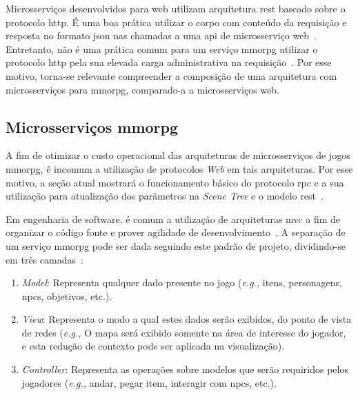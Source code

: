 Microsserviços desenvolvidos para web utilizam arquitetura \ac{rest} baseado sobre o protocolo \ac{http}.
%
É uma boa prática utilizar o corpo com conteúdo da requisição e resposta no formato \ac{json} nas chamadas a uma \ac{api} de microsserviço web~\cite{Nadareishvili2016Aug}.
%
Entretanto, não é uma prática comum para um serviço \ac{mmorpg} utilizar o protocolo \ac{http} pela sua elevada carga administrativa na requisição~\cite{1417630}.
%
Por esse motivo, torna-se relevante compreender a composição de uma arquitetura com microsserviços para \ac{mmorpg}, comparado-a a microsserviços web.



\subsection{Microsserviços \ac{mmorpg}}
\label{sec:arquiteturas}



A fim de otimizar o custo operacional das arquiteturas de microsserviços de jogos \ac{mmorpg}, é incomum a utilização de protocolos \textit{Web} em tais arquiteturas.
%
Por esse motivo, a seção atual mostrará o funcionamento básico do protocolo \ac{rpc} e a sua utilização para atualização dos parâmetros na \textit{Scene Tree} e o modelo \ac{rest}~\cite{albion_online_unite}.



Em engenharia de software, é comum a utilização de arquiteturas \ac{mvc} a fim de organizar o código fonte e prover agilidade de desenvolvimento~\cite{Chadwick2012Oct, LeckyThompson2008Nov}.
%
A separação de um serviço \ac{mmorpg} pode ser dada seguindo este padrão de projeto, dividindo-se em três camadas~\cite{5718337}:


\begin{enumerate}
  \item \textit{Model}: Representa qualquer dado presente no jogo (\textit{e.g.,} itens, personagens, \ac{npcs}, objetivos, etc.).
  \item \textit{View}: Representa o modo a qual estes dados serão exibidos, do ponto de vista de redes (\textit{e.g.,} O mapa será exibido somente na área de interesse do jogador, e esta redução de contexto pode ser aplicada na visualização).
  \item \textit{Controller}: Representa as operações sobre modelos que serão requiridos pelos jogadores (\textit{e.g.,} andar, pegar item, interagir com \ac{npcs}, etc.).
\end{enumerate}



